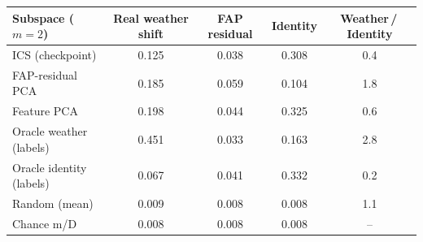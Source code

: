 \begin{tabular}{lcccc}
\toprule
Subspace ($m{=}2$) & Real weather shift & FAP residual & Identity & Weather\,/\,Identity \\
\midrule
ICS (checkpoint) & 0.125 & 0.038 & 0.308 & 0.4 \\
FAP-residual PCA & 0.185 & 0.059 & 0.104 & 1.8 \\
Feature PCA & 0.198 & 0.044 & 0.325 & 0.6 \\
Oracle weather (labels) & 0.451 & 0.033 & 0.163 & 2.8 \\
Oracle identity (labels) & 0.067 & 0.041 & 0.332 & 0.2 \\
Random (mean) & 0.009 & 0.008 & 0.008 & 1.1 \\
Chance m/D & 0.008 & 0.008 & 0.008 & -- \\
\bottomrule
\end{tabular}
